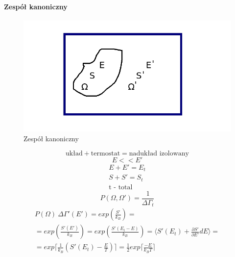 \documentclass{article}
\begin{document}
		\paragraph{Zespół kanoniczny}
		\begin{figure}[ht]
			\label{fig:fig1}
			\centering
			\includegraphics[scale=0.5]{kanoniczny.jpeg}
			\caption{Zespół kanoniczny}
		\end{figure}
		\begin{equation}
		\text{układ} + \text{termostat} = \text{nadukład izolowany}
		\end{equation}
		\begin{equation}
		E << E'
		\end{equation}
		\begin{equation}
			\begin{array}{cc}
			 E + E' = E_t \\
			 S + S' = S_t \\
			 \text{t - total}
			\end{array}
		\end{equation}
		\begin{equation}
		P(\Omega, \Omega ') = \frac{1}{\Delta \Gamma_t}
		\end{equation}
		\begin{equation}
		\begin{array}{cc}
		P(\Omega) ~ \Delta \Gamma'(E') = exp(\frac{S'}{k_B}) = \\
		= exp(\frac{S'(E')}{k_B}) = exp(\frac{S'(E_t - E)}{k_B}) = 
		\Big \langle S'(E_t) + \frac{\partial S'}{\partial E'} dE \Big \rangle = \\
		= exp \lceil \frac{1}{k_B}(S'(E_t) - \frac{E}{T})\rceil = 
		\frac{1}{2} exp\lceil \frac{-E}{k_BT} \rceil
	
		\end{array}
		\end{equation}
\end{document}
